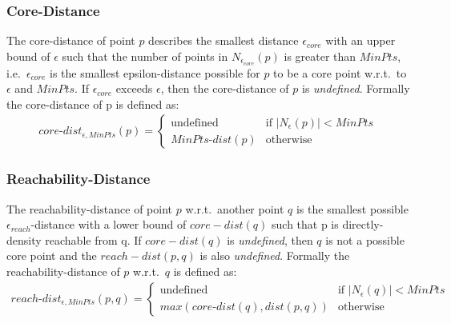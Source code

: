 \subsubsection*{Core-Distance}
The core-distance of point $p$ describes the smallest distance $\epsilon_{core}$ with an upper bound of $\epsilon$ such that the number of points in $N_{\epsilon_{core}}(p)$ is greater than $MinPts$, i.e.\ $\epsilon_{core}$ is the smallest epsilon-distance possible for $p$ to be a core point w.r.t.\ to $\epsilon$ and $MinPts$. If $\epsilon_{core}$ exceeds $\epsilon$, then the core-distance of $p$ is \textit{undefined}. Formally the core-distance of p is defined as:
\begin{align}
    core\text{-}dist_{\epsilon,MinPts}(p)=
    \begin{cases}
        \text{undefined} &\text{if } |N_\epsilon(p)| < MinPts\\
        MinPts\text{-}dist(p) &\text{otherwise}
    \end{cases}
\end{align}

\subsubsection*{Reachability-Distance}
The reachability-distance of point $p$ w.r.t.\ another point $q$ is the smallest possible $\epsilon_{reach}$-distance with a lower bound of $core-dist(q)$ such that p is directly-density reachable from q. If $core-dist(q)$ is \textit{undefined}, then $q$ is not a possible core point and the $reach-dist(p,q)$ is also \textit{undefined}.
Formally the reachability-distance of $p$ w.r.t.\ $q$ is defined as:
\begin{align}
    reach\text{-}dist_{\epsilon,MinPts}(p,q)=
    \begin{cases}
        \text{undefined} &\text{if } |N_\epsilon(q)| < MinPts\\
        max(core\text{-}dist(q), dist(p,q)) &\text{otherwise}
    \end{cases}
\end{align}

